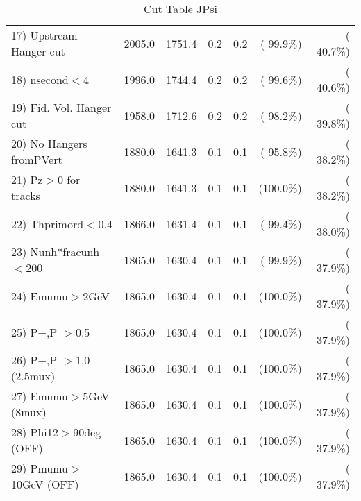 \begin{table}[h!]
\begin{tabular}{||l||r|r|r|r|r|r||}
 17) Upstream Hanger cut  &       2005.0 &       1751.4 &          0.2 &          0.2 & ( 99.9\%) & ( 40.7\%) \\
 18) nsecond$<$4          &       1996.0 &       1744.4 &          0.2 &          0.2 & ( 99.6\%) & ( 40.6\%) \\
 19) Fid. Vol. Hanger cut &       1958.0 &       1712.6 &          0.2 &          0.2 & ( 98.2\%) & ( 39.8\%) \\
 20) No Hangers fromPVert &       1880.0 &       1641.3 &          0.1 &          0.1 & ( 95.8\%) & ( 38.2\%) \\
 21) Pz$>$0 for tracks    &       1880.0 &       1641.3 &          0.1 &          0.1 & (100.0\%) & ( 38.2\%) \\
 22) Thprimord$<$0.4      &       1866.0 &       1631.4 &          0.1 &          0.1 & ( 99.4\%) & ( 38.0\%) \\
 23) Nunh*fracunh$<$200   &       1865.0 &       1630.4 &          0.1 &          0.1 & ( 99.9\%) & ( 37.9\%) \\
 24) Emumu$>$2GeV         &       1865.0 &       1630.4 &          0.1 &          0.1 & (100.0\%) & ( 37.9\%) \\
 25) P+,P-$>$0.5          &       1865.0 &       1630.4 &          0.1 &          0.1 & (100.0\%) & ( 37.9\%) \\
 26) P+,P-$>$1.0 (2.5mux) &       1865.0 &       1630.4 &          0.1 &          0.1 & (100.0\%) & ( 37.9\%) \\
 27) Emumu$>$5GeV  (8mux) &       1865.0 &       1630.4 &          0.1 &          0.1 & (100.0\%) & ( 37.9\%) \\
 28) Phi12$>$90deg  (OFF) &       1865.0 &       1630.4 &          0.1 &          0.1 & (100.0\%) & ( 37.9\%) \\
 29) Pmumu$>$10GeV  (OFF) &       1865.0 &       1630.4 &          0.1 &          0.1 & (100.0\%) & ( 37.9\%) \\
 \hline
 \hline
 \end{tabular}
 \caption{Cut Table  JPsi     }
 \label{tab-cutcohjpsi-mumu_jpsi}
 \end{table}

